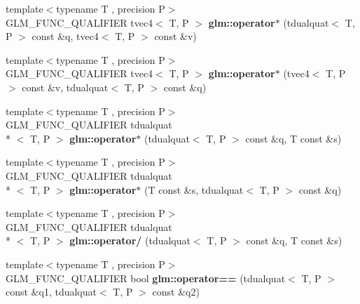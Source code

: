 \begin{DoxyCompactItemize}
\item 
\hypertarget{namespaceglm_af7e4c7f9357bbbd507b6c3e21c615155}{{\footnotesize template$<$typename T , precision P$>$ }\\G\-L\-M\-\_\-\-F\-U\-N\-C\-\_\-\-Q\-U\-A\-L\-I\-F\-I\-E\-R tvec4$<$ T, P $>$ {\bfseries glm\-::operator$\ast$} (tdualquat$<$ T, P $>$ const \&q, tvec4$<$ T, P $>$ const \&v)}\label{namespaceglm_af7e4c7f9357bbbd507b6c3e21c615155}

\item 
\hypertarget{namespaceglm_a7b2a46a8862527e45c3d7bd3fdfcfa10}{{\footnotesize template$<$typename T , precision P$>$ }\\G\-L\-M\-\_\-\-F\-U\-N\-C\-\_\-\-Q\-U\-A\-L\-I\-F\-I\-E\-R tvec4$<$ T, P $>$ {\bfseries glm\-::operator$\ast$} (tvec4$<$ T, P $>$ const \&v, tdualquat$<$ T, P $>$ const \&q)}\label{namespaceglm_a7b2a46a8862527e45c3d7bd3fdfcfa10}

\item 
\hypertarget{group__gtx__dual__quaternion_ga5251d67271c42cf52227b6254f3fc8ed}{{\footnotesize template$<$typename T , precision P$>$ }\\G\-L\-M\-\_\-\-F\-U\-N\-C\-\_\-\-Q\-U\-A\-L\-I\-F\-I\-E\-R tdualquat\\*
$<$ T, P $>$ {\bfseries glm\-::operator$\ast$} (tdualquat$<$ T, P $>$ const \&q, T const \&s)}\label{group__gtx__dual__quaternion_ga5251d67271c42cf52227b6254f3fc8ed}

\item 
\hypertarget{group__gtx__dual__quaternion_ga0aedf77f3e7d45464501570c28df0ed7}{{\footnotesize template$<$typename T , precision P$>$ }\\G\-L\-M\-\_\-\-F\-U\-N\-C\-\_\-\-Q\-U\-A\-L\-I\-F\-I\-E\-R tdualquat\\*
$<$ T, P $>$ {\bfseries glm\-::operator$\ast$} (T const \&s, tdualquat$<$ T, P $>$ const \&q)}\label{group__gtx__dual__quaternion_ga0aedf77f3e7d45464501570c28df0ed7}

\item 
\hypertarget{group__gtx__dual__quaternion_gad27b1d064624dd6ff1ecc205616323ba}{{\footnotesize template$<$typename T , precision P$>$ }\\G\-L\-M\-\_\-\-F\-U\-N\-C\-\_\-\-Q\-U\-A\-L\-I\-F\-I\-E\-R tdualquat\\*
$<$ T, P $>$ {\bfseries glm\-::operator/} (tdualquat$<$ T, P $>$ const \&q, T const \&s)}\label{group__gtx__dual__quaternion_gad27b1d064624dd6ff1ecc205616323ba}

\item 
\hypertarget{namespaceglm_aad95e2ae87bce8bf591ce20fc6997f49}{{\footnotesize template$<$typename T , precision P$>$ }\\G\-L\-M\-\_\-\-F\-U\-N\-C\-\_\-\-Q\-U\-A\-L\-I\-F\-I\-E\-R bool {\bfseries glm\-::operator==} (tdualquat$<$ T, P $>$ const \&q1, tdualquat$<$ T, P $>$ const \&q2)}\label{namespaceglm_aad95e2ae87bce8bf591ce20fc6997f49}


\end{DoxyCompactItemize}
